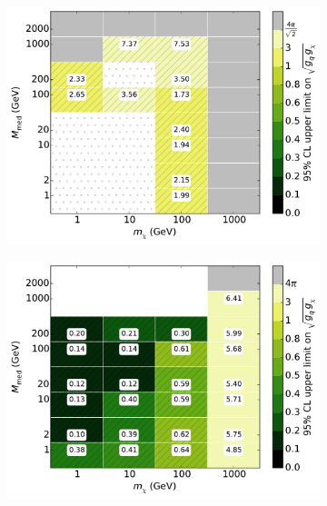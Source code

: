 \begin{figure}[h]
\begin{subfigure}[t]{0.325\textwidth}
      \includegraphics[width=1.\textwidth]{figures/grid_basepoints_SVD_rat05_monoWZ.pdf}
      \caption{}
    \end{subfigure}
    \begin{subfigure}[t]{0.325\textwidth}
      \centering
      \includegraphics[width=1.\textwidth]{figures/grid_basepoints_SVD_rat1_monojet.pdf}
      \caption{}
    \end{subfigure}
    \begin{subfigure}[t]{0.325\textwidth}
      \centering

\end{subfigure}
\end{figure}
